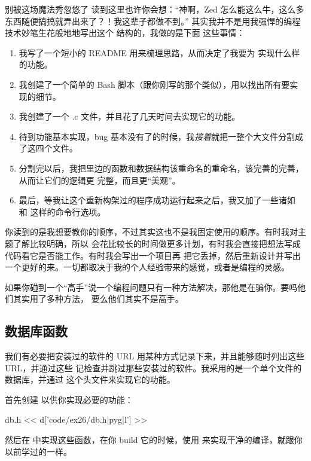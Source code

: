 \begin{aside}{别被这场魔法秀忽悠了}
读到这里也许你会想：“神啊，Zed 怎么能这么牛，这么多东西随便搞搞就弄出来了？！我这辈子都做不到。”
其实我并不是用我强悍的编程技术妙笔生花般地地写出这个  结构的，我做的是下面
这些事情：

\begin{enumerate}
\item 我写了一个短小的 README 用来梳理思路，从而决定了我要为  实现什么样
    的功能。
\item 我创建了一个简单的 Bash 脚本（跟你刚写的那个类似），用以找出所有要实现的细节。
\item 我创建了一个 .c 文件，并且花了几天时间去实现它的功能。
\item 待到功能基本实现，bug 基本没有了的时候，我\emph{接着}就把一整个大文件分割成了这四个文件。
\item 分割完以后，我把里边的函数和数据结构该重命名的重命名，该完善的完善，从而让它们的逻辑更
    完整，而且更“美观”。
\item 最后，等我让这个重新构架过的程序成功运行起来之后，我又加了一些诸如  和
     这样的命令行选项。
\end{enumerate}

你读到的是我想要教你的顺序，不过其实这也不是我固定使用的顺序。有时我对主题了解比较明确，所以
会花比较长的时间做更多计划，有时我会直接把想法写成代码看它是否能工作。有时我会写出一个项目再
把它丢掉，然后重新设计并写出一个更好的来。一切都取决于我的个人经验带来的感觉，或者是编程的灵感。

如果你碰到一个“高手”说一个编程问题只有一种方法解决，那他是在骗你。要吗他们其实用了多种方法，
要么他们其实不是高手。
\end{aside}

\subsection{数据库函数}

我们有必要把安装过的软件的 URL 用某种方式记录下来，并且能够随时列出这些 URL，并通过这些
记检查并跳过那些安装过的软件。我采用的是一个单个文件的数据库，并通过  
这个头文件来实现它的功能。

首先创建  以供你实现必要的功能：

\begin{code}{db.h}
<< d['code/ex26/db.h|pyg|l'] >>
\end{code}

然后在  中实现这些函数，在你 build 它的时候，使用  
来实现干净的编译，就跟你以前学过的一样。

